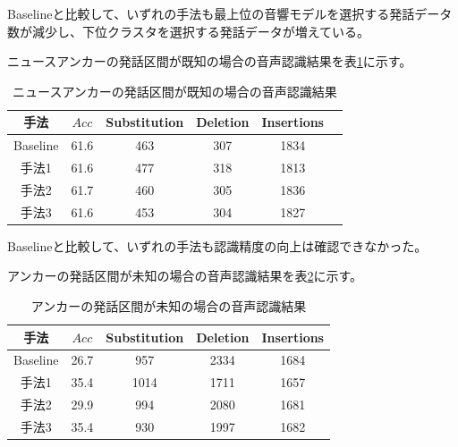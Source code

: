 Baselineと比較して、いずれの手法も最上位の音響モデルを選択する発話データ数が減少し、下位クラスタを選択する発話データが増えている。\\

\par
ニュースアンカーの発話区間が既知の場合の音声認識結果を表\ref{table:result_sprecog1}に示す。

\begin{table}[H]
  \begin{center}
    \caption{ニュースアンカーの発話区間が既知の場合の音声認識結果 \label{table:result_sprecog1}}
    \begin{tabular}{|c||c|c|c|c|c|} \hline
     手法  & $Acc$ & Substitution & Deletion & Insertions \\ \hline
     Baseline  & 61.6 & 463 & 307 & 1834 \\ \hline
     手法1  & 61.6 & 477 & 318 & 1813 \\ \hline
     手法2  & 61.7 & 460 & 305 & 1836 \\ \hline
     手法3  & 61.6 & 453 & 304 & 1827 \\ \hline
    \end{tabular}
  \end{center}
\end{table}

Baselineと比較して、いずれの手法も認識精度の向上は確認できなかった。

\vspace{0.2in}  \par
アンカーの発話区間が未知の場合の音声認識結果を表\ref{table:result_sprecog2}に示す。

\begin{table}[H]
  \begin{center}
    \caption{アンカーの発話区間が未知の場合の音声認識結果 \label{table:result_sprecog2}}
    \begin{tabular}{|c||c|c|c|c|} \hline
     手法  & $Acc$ & Substitution & Deletion & Insertions \\ \hline
     Baseline & 26.7 & 957 & 2334 & 1684 \\ \hline
     手法1  & 35.4 & 1014 & 1711 & 1657 \\ \hline
     手法2  & 29.9 & 994 & 2080  & 1681 \\ \hline  
     手法3  & 35.4 & 930 & 1997 & 1682 \\ \hline
    \end{tabular}
  \end{center}
\end{table}

